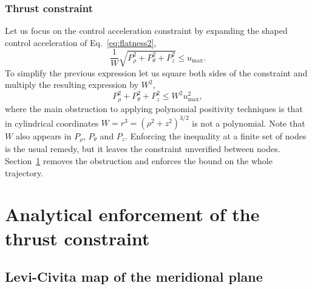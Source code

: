 \subsubsection{Thrust constraint}
\label{sec:thrust}

Let us focus on the control acceleration constraint by expanding the shaped
control acceleration of Eq.~\eqref{eq:flatness2},
\begin{equation}
\dfrac{1}{W}\sqrt{P^2_\rho+P^2_\theta+P^2_z}\leq u_{\max}.
\end{equation}
To simplify the previous expression let us square both sides of the
constraint and multiply the resulting expression by $W^2$,
\begin{equation}
P^2_\rho+P^2_\theta+P^2_z \leq W^2 u^2_{\max},
\label{eq:squared-thrust-constraint}
\end{equation}
where the main obstruction to applying polynomial positivity techniques is
that in cylindrical coordinates $W=r^3=(\rho^2+z^2)^{3/2}$ is not a
polynomial. Note that $W$ also appears in $P_\rho$, $P_\theta$ and $P_z$.
Enforcing the inequality at a finite set of nodes is the usual remedy, but it
leaves the constraint unverified between nodes. Section~\ref{sec:enforcement}
removes the obstruction and enforces the bound on the whole trajectory.

\section{Analytical enforcement of the thrust constraint}
\label{sec:enforcement}

\subsection{Levi-Civita map of the meridional plane}
\label{sec:pythagorean}

